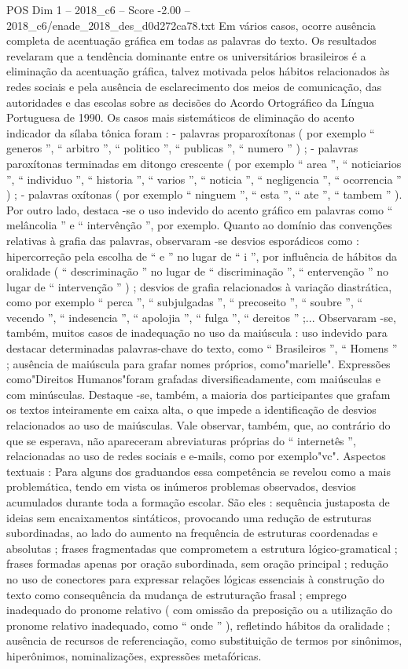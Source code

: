 \begin{textsample}{POS Dim 1 – 2018\_c6 – Score -2.00 – 2018\_c6/enade\_2018\_des\_d0d272ca78.txt}
Em vários casos, ocorre ausência completa de acentuação gráfica em todas as palavras do texto.
Os resultados revelaram que a tendência dominante entre os universitários brasileiros é a eliminação da acentuação gráfica, talvez motivada pelos hábitos relacionados às redes sociais e pela ausência de esclarecimento dos meios de comunicação, das autoridades e das escolas sobre as decisões do Acordo Ortográfico da Língua Portuguesa de 1990.
Os casos mais sistemáticos de eliminação do acento indicador da sílaba tônica foram : - palavras proparoxítonas ( por exemplo “ generos ”, “ arbitro ”, “ politico ”, “ publicas ”, “ numero ” ) ; - palavras paroxítonas terminadas em ditongo crescente ( por exemplo “ area ”, “ noticiarios ”, “ individuo ”, “ historia ”, “ varios ”, “ noticia ”, “ negligencia ”, “ ocorrencia ” ) ; - palavras oxítonas ( por exemplo “ ninguem ”, “ esta ”, “ ate ”, “ tambem ” ).
Por outro lado, destaca -se o uso indevido do acento gráfico em palavras como “ melâncolia ” e “ intervênção ”, por exemplo.
Quanto ao domínio das convenções relativas à grafia das palavras, observaram -se desvios esporádicos como : hipercorreção pela escolha de “ e ” no lugar de “ i ”, por influência de hábitos da oralidade ( “ descriminação ” no lugar de “ discriminação ”, “ entervenção ” no lugar de “ intervenção ” ) ; desvios de grafia relacionados à variação diastrática, como por exemplo “ perca ”, “ subjulgadas ”, “ precoseito ”, “ soubre ”, “ vecendo ”, “ indesencia ”, “ apolojia ”, “ fulga ”, “ dereitos ” ;...
Observaram -se, também, muitos casos de inadequação no uso da maiúscula : uso indevido para destacar determinadas palavras-chave do texto, como “ Brasileiros ”, “ Homens ” ; ausência de maiúscula para grafar nomes próprios, como"marielle".
Expressões como"Direitos Humanos"foram grafadas diversificadamente, com maiúsculas e com minúsculas.
Destaque -se, também, a maioria dos participantes que grafam os textos inteiramente em caixa alta, o que impede a identificação de desvios relacionados ao uso de maiúsculas.
Vale observar, também, que, ao contrário do que se esperava, não apareceram abreviaturas próprias do “ internetês ”, relacionadas ao uso de redes sociais e e-mails, como por exemplo"vc".
Aspectos textuais : Para alguns dos graduandos essa competência se revelou como a mais problemática, tendo em vista os inúmeros problemas observados, desvios acumulados durante toda a formação escolar.
São eles : sequência justaposta de ideias sem encaixamentos sintáticos, provocando uma redução de estruturas subordinadas, ao lado do aumento na frequência de estruturas coordenadas e absolutas ; frases fragmentadas que comprometem a estrutura lógico-gramatical ; frases formadas apenas por oração subordinada, sem oração principal ; redução no uso de conectores para expressar relações lógicas essenciais à construção do texto como consequência da mudança de estruturação frasal ; emprego inadequado do pronome relativo ( com omissão da preposição ou a utilização do pronome relativo inadequado, como “ onde ” ), refletindo hábitos da oralidade ; ausência de recursos de referenciação, como substituição de termos por sinônimos, hiperônimos, nominalizações, expressões metafóricas.

\end{textsample}
